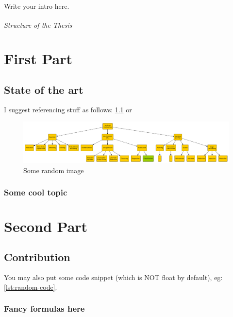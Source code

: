\documentclass[12pt,a4paper,openright,twoside]{book}
\begin{document}
Write your intro here.

\paragraph{Structure of the Thesis}


\part{First Part}

\chapter{State of the art}

I suggest referencing stuff as follows: \cref{fig:random-image} or 

\begin{figure}
    \centering
    \includegraphics[width=.8\linewidth]{figures/random-image.pdf}
    \caption{Some random image}
    \label{fig:random-image}
\end{figure}

\section{Some cool topic}

\part{Second Part}

\chapter{Contribution}

You may also put some code snippet (which is NOT float by default), eg: \cref{lst:random-code}.



\section{Fancy formulas here}
\end{document}
